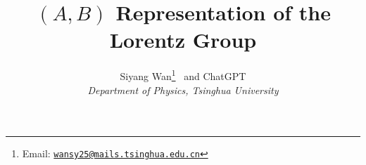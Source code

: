 \documentclass[a4paper,12pt]{article}
\newcommand{\fnemail}[1]{\footnote{Email: \href{mailto:#1}{\nolinkurl{#1}}}}
\numberwithin{equation}{section}
\begin{document}
    \title{\Large\textbf{\texorpdfstring{$(A, B)$}{(A,B)} Representation of the Lorentz Group}}
    \author{Siyang Wan\fnemail{wansy25@mails.tsinghua.edu.cn} \ and ChatGPT\\[5mm] \normalsize{\emph{Department of Physics, Tsinghua University}}}
    \date{}
    \maketitle
    \tableofcontents 
    \newpage
    
    
    
    
    
    
    
\end{document}
